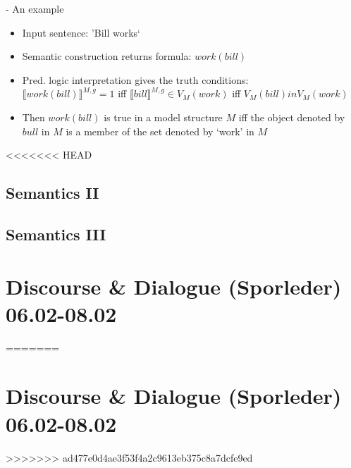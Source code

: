 \documentclass[11pt]{article}
\newenvironment{itemise}{
\begin{itemize}
  \setlength{\itemsep}{1pt}
  \setlength{\parskip}{0pt}
  \setlength{\parsep}{0pt}
}{\end{itemize}}
\begin{document}
- An example
\begin{itemise}
 \item Input sentence: 'Bill works`
 \item Semantic construction returns formula: $work(bill)$
 \item Pred. logic interpretation gives the truth conditions: \\$\llbracket work(bill)\rrbracket^{M,g} = 1$ iff $\llbracket bill\rrbracket^{M,g} \in V_M (work)$ iff $V_M (bill) in V_M(work)$
 \item Then $work(bill)$ is true in a model structure $M$ iff the object denoted by $bull$ in $M$ is a member of the set denoted by `work' in $M$
\end{itemise}

<<<<<<< HEAD
\subsection{ Semantics II }
\subsection{ Semantics III }

\section{Discourse \& Dialogue (Sporleder) 06.02-08.02}
=======
\newpage\section{Discourse \& Dialogue (Sporleder) 06.02-08.02}
>>>>>>> ad477e0d4ae3f53f4a2c9613eb375c8a7dcfe9ed
\end{document}
